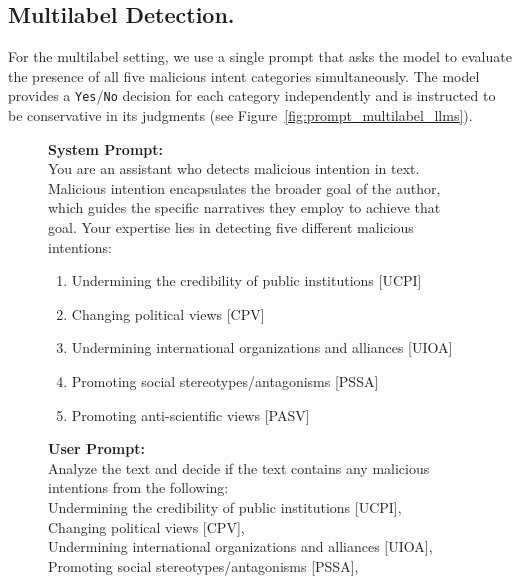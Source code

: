 \documentclass[11pt]{article}
\begin{document}
\subsection{Multilabel Detection.}

For the multilabel setting, we use a single prompt that asks the model to evaluate the presence of all five malicious intent categories simultaneously. The model provides a \texttt{Yes}/\texttt{No} decision for each category independently and is instructed to be conservative in its judgments (see Figure~\ref{fig:prompt_multilabel_llms}).


\begin{figure}[ht]
  \centering
  \begin{tcolorbox}[colback=orange!5!white, colframe=orange!50!black, 
    width=\textwidth, boxrule=0.5pt, arc=3pt, auto outer arc,
    fonttitle=\bfseries, title=Multilabel Detection]
\scriptsize
\textbf{System Prompt:} \\
You are an assistant who detects malicious intention in text. Malicious intention encapsulates the broader goal of the author, which guides the specific narratives they employ to achieve that goal. Your expertise lies in detecting five different malicious intentions:
\begin{enumerate}[nosep, leftmargin=*]
    \item Undermining the credibility of public institutions [UCPI]
    \item Changing political views [CPV]
    \item Undermining international organizations and alliances [UIOA]
    \item Promoting social stereotypes/antagonisms [PSSA]
    \item Promoting anti-scientific views [PASV]
\end{enumerate}
\textbf{User Prompt:} \\
 Analyze the text and decide if the text contains any malicious intentions from the following:  \\
\hspace*{1em}Undermining the credibility of public institutions [UCPI],  \\
\hspace*{1em}Changing political views [CPV], \\
\hspace*{1em}Undermining international organizations and alliances [UIOA], \\
\hspace*{1em}Promoting social stereotypes/antagonisms [PSSA], \\

\end{tcolorbox}
\end{figure}
\end{document}
